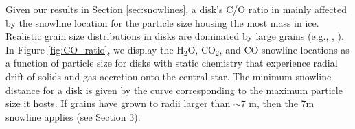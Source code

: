 \documentclass[apj]{emulateapj}
\begin{document}
Given our results in Section \ref{sec:snowlines}, a disk's C/O ratio in mainly affected by the snowline location for the particle size housing the most mass in ice.
Realistic grain size distributions in disks are dominated by large grains (e.g., \citealt{dalessio01}, \citealt{birnstiel12}). In Figure \ref{fig:CO_ratio}, we display the H$_2$O, CO$_2$, and CO snowline locations as a function of particle size for disks with static chemistry that experience radial drift of solids and gas accretion onto the central star.  The minimum snowline distance for a disk is given by the curve corresponding to the maximum particle size it hosts.  If grains have grown to radii larger than $\sim$7 m, then the 7m snowline applies (see Section 3).  %

\end{document}
